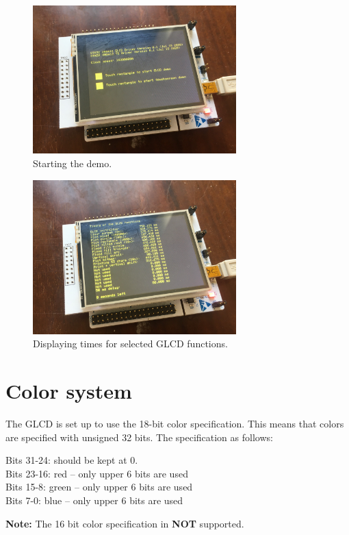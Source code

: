 \documentclass[12pt]{article}
\begin{document}
\begin{figure}[!ht]
\centering
\includegraphics[width=0.7\textwidth]{start_demo}
\caption{Starting the demo.}
\label{fig:2}
\end{figure}

\begin{figure}[!ht]
\centering
\includegraphics[width=0.7\textwidth]{times}
\caption{Displaying times for selected GLCD functions.}
\label{fig:3}
\end{figure}

\section{Color system}
The GLCD is set up to use the 18-bit color specification. This means that colors are specified with unsigned 32 bits. The specification as follows:

Bits 31-24: should be kept at 0.\\
Bits 23-16: red -- only upper 6 bits are used\\
Bits 15-8: green -- only upper 6 bits are used\\
Bits 7-0: blue -- only upper 6 bits are used

\textbf{Note:} The 16 bit color specification in \textbf{NOT} supported.
\end{document}
